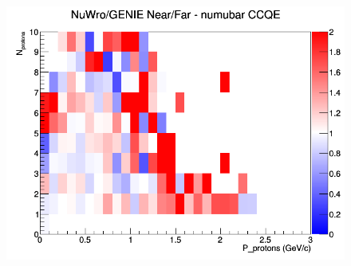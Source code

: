 \begin{figure}[h]
\endminipage
{}
\includegraphics[width=\linewidth]{N_P/nominal/protons/ratios/CCQE_NuWro_GENIE_numubar_NF_N_P.png}
\endminipage
\newline
\end{figure}
\clearpage
